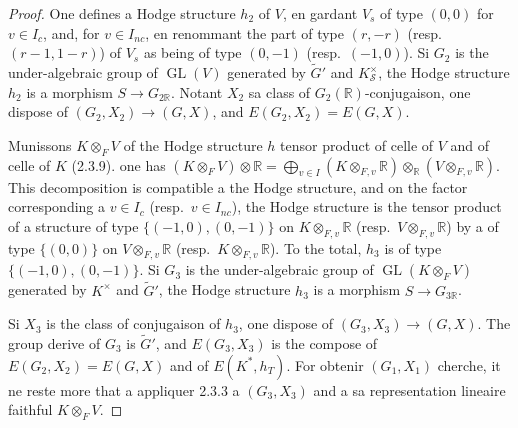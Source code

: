 \documentclass[12pt,a4paper]{article}
\theoremstyle{plain}
\theoremstyle{definition}
\theoremstyle{remark}
\DeclareMathOperator{\GL}{GL}
\newcommand{\RR}{\mathbb{R}}
\begin{document}
\begin{proof}
One defines a Hodge structure $h_2$ of $V$, en gardant $V_s$ of type $(0,0)$ for $v \in I_c$, and, for $v \in I_{nc}$, en renommant the part of type $(r,-r)$ (resp.~$(r-1,1-r)$) of $V_s$ as being of type $(0,-1)$ (resp.~$(-1,0)$). Si $G_2$ is the under-algebraic group of $\GL(V)$ generated by $\tilde{G}'$ and $K_\mathcal{S}^{\times}$, the Hodge structure $h_2$ is a morphism $S \to G_{2\RR}$. Notant $X_2$ sa class of $G_2(\RR)$-conjugaison, one dispose of $(G_2,X_2) \to (G,X)$, and $E(G_2,X_2) = E(G,X)$.

Munissons $K \otimes_F V$ of the Hodge structure $h$ tensor product of celle of $V$ and of celle of $K$ (2.3.9). one has $(K \otimes_F V) \otimes \RR = \bigoplus_{v \in I} (K \otimes_{F,v} \RR) \otimes_\RR (V \otimes_{F,v} \RR)$. This decomposition is compatible a the Hodge structure, and on the factor corresponding a $v \in I_c$ (resp.~$v \in I_{nc}$), the Hodge structure is the tensor product of a structure of type $\{(-1,0),(0,-1)\}$ on $K \otimes_{F,v} \RR$ (resp.~$V \otimes_{F,v} \RR$) by a of type $\{(0,0)\}$ on $V \otimes_{F,v} \RR$ (resp.~$K \otimes_{F,v} \RR$). To the total, $h_3$ is of type $\{(-1,0),(0,-1)\}$. Si $G_3$ is the under-algebraic group of $\GL(K \otimes_F V)$ generated by $K^{\times}$ and $\tilde{G}'$, the Hodge structure $h_3$ is a morphism $S \to G_{3\RR}$.

Si $X_3$ is the class of conjugaison of $h_3$, one dispose of $(G_3,X_3) \to (G,X)$. The group derive of $G_3$ is $\tilde{G}'$, and $E(G_3,X_3)$ is the compose of $E(G_2,X_2) = E(G,X)$ and of $E(K^*,h_T)$. For obtenir $(G_1,X_1)$ cherche, it ne reste more that a appliquer 2.3.3 a $(G_3,X_3)$ and a sa representation lineaire faithful $K \otimes_F V$.
\end{proof}
\end{document}
